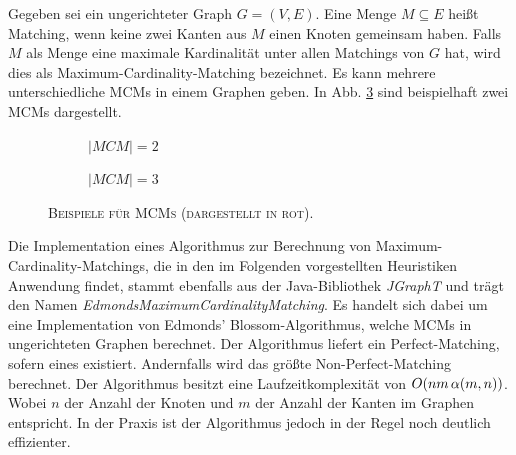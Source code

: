 Gegeben sei ein ungerichteter Graph $G = (V, E)$. Eine Menge $M \subseteq E$ heißt Matching,
wenn keine zwei Kanten aus $M$ einen Knoten gemeinsam haben. Falls $M$ als Menge eine maximale Kardinalität unter
allen Matchings von $G$ hat, wird dies als Maximum-Cardinality-Matching bezeichnet. \cite{WikiMatching}
Es kann mehrere unterschiedliche MCMs in einem Graphen geben.
In Abb. \ref{fig:mcm_examples} sind beispielhaft zwei MCMs dargestellt.
\begin{figure}[H]
  \begin{subfigure}[b]{0.4\textwidth}
  \centering
  \caption{\textsc{$|MCM| = 2$}}
  \label{fig:mcm1}
  \end{subfigure}
  \hfill
  \begin{subfigure}[b]{0.4\textwidth}
  \centering
    \caption{\textsc{$|MCM| = 3$}}
    \label{fig:mcm_2}
  \end{subfigure}
  \caption{\textsc{Beispiele für MCMs (dargestellt in rot).}}
  \label{fig:mcm_examples}
\end{figure}

Die Implementation eines Algorithmus zur Berechnung von Maximum-Cardinality-Matchings, die in den im Folgenden
vorgestellten Heuristiken Anwendung findet, stammt ebenfalls aus der Java-Bibliothek \textit{JGraphT} \cite{JGraphT} und trägt
den Namen \textit{EdmondsMaximumCardinalityMatching}. Es handelt sich dabei um eine Implementation von Edmonds' Blossom-Algorithmus,
welche MCMs in ungerichteten Graphen berechnet. Der Algorithmus liefert ein Perfect-Matching, sofern eines existiert.
Andernfalls wird das größte Non-Perfect-Matching berechnet.
Der Algorithmus besitzt eine Laufzeitkomplexität von $O(nm \thinspace \alpha(m, n))$. Wobei $n$ der Anzahl der Knoten
und $m$ der Anzahl der Kanten im Graphen entspricht. In der Praxis ist der Algorithmus jedoch in der Regel noch deutlich effizienter.

